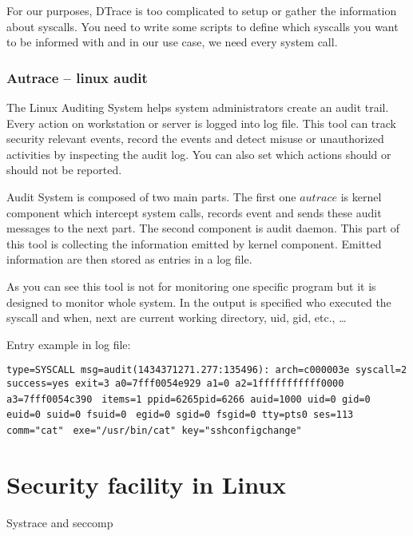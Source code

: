 For our purposes, DTrace is too complicated to setup or gather the information about syscalls.
You need to write some scripts to define which syscalls you want to be informed with and in our use case, we need every system call.

\subsection{Autrace -- linux audit}
The Linux Auditing System helps system administrators create an audit trail.
Every action on workstation or server is logged into log file.
This tool can track security relevant events, record the events and detect misuse or unauthorized activities by inspecting the audit log.
You can also set which actions should or should not be reported. 

Audit System is composed of two main parts.
The first one \(autrace\) is kernel component which intercept system calls, records event and sends these audit messages to the next part.
The second component is audit daemon.
This part of this tool is collecting the information emitted by kernel component.
Emitted information are then stored as entries in a log file.

As you can see this tool is not for monitoring one specific program but it is designed to monitor whole system.
In the output is specified who executed the syscall and when, next are current working directory, uid, gid, etc., \ldots

Entry example in log file:

\noindent
\texttt{type=SYSCALL msg=audit(1434371271.277:135496): arch=c000003e syscall=2}\linebreak
\texttt{success=yes exit=3 a0=7fff0054e929 a1=0 a2=1fffffffffff0000 a3=7fff0054c390 }\linebreak
\texttt{items=1 ppid=6265pid=6266 auid=1000 uid=0 gid=0 euid=0 suid=0 fsuid=0 }\linebreak
\texttt{egid=0 sgid=0 fsgid=0 tty=pts0 ses=113 comm="cat" }\linebreak
\texttt{exe="/usr/bin/cat" key="sshconfigchange"}



\chapter{Security facility in Linux}

Systrace\cite{systrace_web} and seccomp\cite{seccomp_sandbox}

